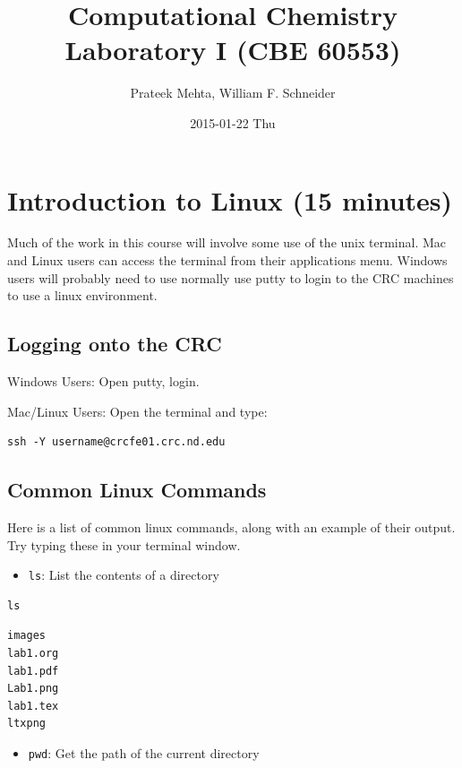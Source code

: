 \documentclass[11pt]{article}
\author{Prateek Mehta, William F. Schneider}
\date{2015-01-22 Thu}
\title{Computational Chemistry Laboratory I (CBE 60553)}
\begin{document}
\maketitle

\section{Introduction to Linux (15 minutes)}
\label{sec-1}

Much of the work in this course will involve some use of the unix terminal. Mac and Linux users can access the terminal from their applications menu. Windows users will probably need to use normally use putty to login to the CRC machines to use a linux environment.

\subsection{Logging onto the CRC}
\label{sec-1-1}

Windows Users: Open putty, login. 

Mac/Linux Users: Open the terminal and type: 

\begin{verbatim}
ssh -Y username@crcfe01.crc.nd.edu
\end{verbatim}


\subsection{Common Linux Commands}
\label{sec-1-2}

Here is a list of common linux commands, along with an example of their output. Try typing these in your terminal window.

\begin{itemize}
\item \verb~ls~: List the contents of a directory
\end{itemize}

\begin{verbatim}
ls
\end{verbatim}

\begin{verbatim}
images
lab1.org
lab1.pdf
Lab1.png
lab1.tex
ltxpng
\end{verbatim}

\begin{itemize}
\item \verb~pwd~: Get the path of the current directory
\end{itemize}
\end{document}
